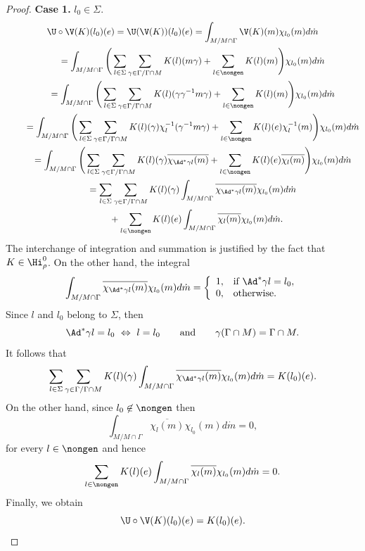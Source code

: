 \begin{proof}
\textbf{Case 1.}  $l_0\in \Sigma$.
\begin{gather*}
\U\circ \V(K)(l_0)(e) = \U( \V(K))(l_0)(e)  = \int_{M/M\cap \Gamma} \V(K)(m) \chi_{l_0}(m) d\dot{m}\\
\qquad{} = \int_{M/M\cap \Gamma} \Bigg( \sum_{l\in \Sigma}
\sum_{\gamma\in \Gamma/\Gamma\cap M} K(l)(m\gamma)+ \sum
_{l\in \nongen} K(l) (m)\Bigg)\chi_{l_0}(m) d\dot{m}\\
\qquad{} = \int_{M/M\cap \Gamma} \Bigg( \sum_{l\in \Sigma}
\sum_{\gamma\in \Gamma/\Gamma\cap M} K(l)(\gamma \gamma
^{-1}m\gamma)+ \sum
_{l\in \nongen} K(l) (m)\Bigg)\chi_{l_0}(m) d\dot{m}\\
\qquad{} = \int_{M/M\cap \Gamma} \Bigg( \sum_{l\in \Sigma}
\sum_{\gamma\in \Gamma/\Gamma\cap M} K(l)(\gamma
)\chi_{l}^{-1}(\gamma ^{-1}m\gamma) + \sum
_{l\in \nongen} K(l) (e)\chi_l^{-1}(m)\Bigg)\chi_{l_0}(m) d\dot{m}\\
\qquad{} = \int_{M/M\cap \Gamma} \Bigg( \sum_{l\in \Sigma}
\sum_{\gamma\in \Gamma/\Gamma\cap M} K(l)(\gamma
)\overline{\chi_{\Ad^*\gamma l}(m)} + \sum
_{l\in \nongen} K(l) (e)\overline{\chi_l(m)}\Bigg)\chi_{l_0}(m) d\dot{m}\\
\qquad{} =   \sum_{l\in \Sigma} \sum_{\gamma\in \Gamma/\Gamma\cap M}
K(l)(\gamma )\int_{M/M\cap \Gamma} \overline{\chi_{\Ad^*\gamma
l}(m)}\chi_{l_0}(m) d\dot{m} \\
\qquad\quad{} + \sum _{l\in \nongen} K(l) (e)
\int_{M/M\cap \Gamma} \overline{\chi_l(m)}\chi_{l_0}(m) d\dot{m}.
\end{gather*}
The interchange of integration and summation is justif\/ied by the
fact that $K\in \Hi^0_\rho$. On the other hand, the integral
\[
\int_{M/M\cap \Gamma}
\overline{\chi_{\Ad^*\gamma l}(m)} \chi_{l_0}(m) d\dot{m} = \left\{
  \begin{array}{ll}
    1, & \hbox{if} \ \Ad^*\gamma l = l_0, \\
    0, & \hbox{otherwise.}
  \end{array}
\right.
\]
Since $l$ and $l_0$ belong to $\Sigma$, then
\[
\Ad^*\gamma l= l_0 \ \Leftrightarrow \ l = l_{0}\qquad \mbox{and} \qquad
\gamma(\Gamma\cap M)= \Gamma\cap M.
\] It follows that
\[
\sum_{l\in \Sigma} \sum_{\gamma\in \Gamma/\Gamma\cap M}
K(l)(\gamma )\int_{M/M\cap \Gamma} \overline{\chi_{\Ad^*\gamma
l}(m)}\chi_{l_0}(m) d\dot{m}=K(l_0)(e).
\] On the other hand, since
$l_0\not\in \nongen$ then
\[
\int_{M/M\cap \Gamma}
\overline{\chi_l(m)}\chi_{l_0}(m) d\dot{m}=0,
\] for every $l\in
\nongen$ and hence
\[
\sum _{l\in \nongen} K(l) (e)
\int_{M/M\cap \Gamma} \overline{\chi_l(m)}\chi_{l_0}(m)
d\dot{m}=0.
\] Finally, we obtain
\[
\U\circ \V(K)(l_0)(e)= K(l_0)(e).
\]





\end{proof}
